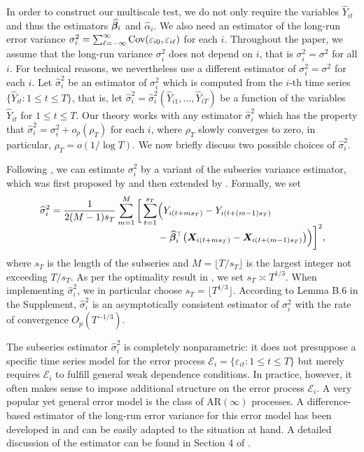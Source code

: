 \documentclass[12pt]{article}
\begin{document}
In order to construct our multiscale test, we do not only require the variables $\widehat{Y}_{it}$ and thus the estimators $\widehat{\bm{\beta}}_i$ and $\widehat{\alpha}_i$. We also need an estimator of the long-run error variance $\sigma_i^2 = \sum\nolimits_{\ell=-\infty}^{\infty} \textnormal{Cov}(\varepsilon_{i0}, \varepsilon_{i\ell})$ for each $i$. Throughout the paper, we assume that the long-run variance $\sigma_i^2$ does not depend on $i$, that is $\sigma_i^2 = \sigma^2$ for all $i$. For technical reasons, we nevertheless use a different estimator of $\sigma_i^2 = \sigma^2$ for each $i$. Let $\widehat{\sigma}_i^2$ be an estimator of $\sigma_i^2$ which is computed from the $i$-th time series $\{ \widehat{Y}_{it}: 1 \le t \le T \}$, that is, let $\widehat{\sigma}_i^2 = \widehat{\sigma}_i^2(\widehat{Y}_{i1},\ldots,\widehat{Y}_{iT})$ be a function of the variables $\widehat{Y}_{it}$ for $1 \le t \le T$. Our theory works with any estimator $\widehat{\sigma}_i^2$ which has the property that $\widehat{\sigma}_i^2 = \sigma_i^2 + o_p(\rho_T)$ for each $i$, where $\rho_T$ slowly converges to zero, in particular, $\rho_T = o(1/\log T)$.
We now briefly discuss two possible choices of $\widehat{\sigma}_i^2$. 


Following \cite{Kim2016}, we can estimate $\sigma_i^2$ by a variant of the subseries variance estimator, which was first proposed by \cite{Carlstein1986} and then extended by \cite{WuZhao2007}. Formally, we set
\begin{align}
\widehat{\sigma}_i^2 = \frac{1}{2(M-1)s_T}\sum_{m=1}^M \bigg[ \sum_{t = 1}^{s_T} & \Big(Y_{i(t + ms_T)} - Y_{i(t + (m-1)s_T)} \nonumber \\[-0.2cm] & - \widehat{\bm{\beta}}_i^\top\big(\boldsymbol{X}_{i(t+ms_T)} - \boldsymbol{X}_{i(t+(m-1)s_T)}\big) \Big)\bigg]^2, \label{eq:lrv}
\end{align}
where $s_T$ is the length of the subseries and $M = \lfloor T/s_T\rfloor$ is the largest integer not exceeding $T/s_T$. As per the optimality result in \cite{Carlstein1986}, we set $s_T \asymp T^{1/3}$.  When implementing $\widehat{\sigma}_i^2$, we in particular choose $s_T = \lfloor T^{1/3}\rfloor$. According to  Lemma B.6 
in the Supplement, $\widehat{\sigma}_i^2$ is an asymptotically consistent estimator of $\sigma_i^2$ with the rate of convergence $O_p(T^{-1/3})$. 


The subseries estimator $\widehat{\sigma}_i^2$ is completely nonparametric: it does not presuppose a specific time series model for the error process $\mathcal{E}_i = \{ \varepsilon_{it}: 1 \le t \le T\}$ but merely requires $\mathcal{E}_i$ to fulfill general weak dependence conditions. In practice, however, it often makes sense to impose additional structure on the error process $\mathcal{E}_i$. A very popular yet general error model is the class of $\text{AR}(\infty)$ processes. A difference-based estimator of the long-run error variance for this error model has been developed in \cite{KhismatullinaVogt2020} and can be easily adapted to the situation at hand. A detailed discussion of the estimator can be found in Section 4 of \cite{KhismatullinaVogt2020}. 
\end{document}
